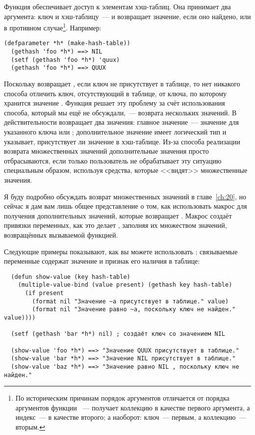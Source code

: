 Функция  обеспечивает доступ к элементам хэш-таблиц.  Она принимает два
аргумента: ключ и хэш-таблицу~--- и возвращает значение, если оно найдено, или  в
противном случае\footnote{По историческим причинам порядок аргументов 
  отличается от порядка аргументов функции ~---  получает коллекцию в
  качестве первого аргумента, а индекс~--- в качестве второго; а  наоборот:
  ключ~--- первым, а коллекцию~--- вторым.}.  Например:

\begin{lstlisting}[style=lisprepl]
  (defparameter *h* (make-hash-table))
  (gethash 'foo *h*) ==> NIL
  (setf (gethash 'foo *h*) 'quux)
  (gethash 'foo *h*) ==> QUUX
\end{lstlisting}

Поскольку  возвращает , если ключ не присутствует в таблице, то нет
никакого способа отличить ключ, отсутствующий в таблице, от ключа, по которому хранится
значение .  Функция  решает эту проблему за счёт использования
способа, который мы ещё не обсуждали,~--- возврата нескольких значений.  В действительности
 возвращает два значения: главное значение~--- значение для указанного ключа
или ;  дополнительное значение имеет логический тип и указывает, присутствует ли
значение в хэш-таблице.  Из-за способа реализации возврата множественных значений
дополнительные значения просто отбрасываются, если только пользователь не обрабатывает эту
ситуацию специальным образом, используя средства, которые <<видят>> множественные значения.

Я буду подробно обсуждать возврат множественных значений в главе~\ref{ch:20}, но сейчас я
дам вам лишь общее представление о том, как использовать макрос 
для получения дополнительных значений, которые возвращает .  Макрос
 создаёт привязки переменных, как это делает ,
заполняя их множеством значений, возвращённых вызываемой функцией.

Следующие примеры показывают, как вы можете использовать ;
связываемые переменные содержат значение и признак его наличия в таблице:

\begin{lstlisting}  
  (defun show-value (key hash-table)
    (multiple-value-bind (value present) (gethash key hash-table)
      (if present
        (format nil "Значение ~a присутствует в таблице." value)
        (format nil "Значение равно ~a, поскольку ключ не найден." value))))

  (setf (gethash 'bar *h*) nil) ; создаёт ключ со значением NIL

  (show-value 'foo *h*) ==> "Значение QUUX присутствует в таблице."
  (show-value 'bar *h*) ==> "Значение NIL присутствует в таблице."
  (show-value 'baz *h*) ==> "Значение равно NIL , поскольку ключ не найден."
\end{lstlisting}

